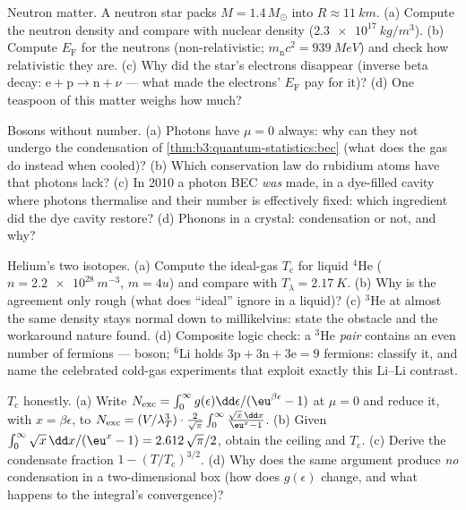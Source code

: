 \begin{exercise}[$\star\star$]\label{exo:b3:quantum-statistics:7}
Neutron matter. A neutron star packs $M = 1.4\,M_\odot$ into $R
\approx \qty{11}{km}$. (a) Compute the neutron density and compare
with nuclear density ($\qty{2.3e17}{kg/m^3}$). (b) Compute
$E_{\text{F}}$ for the neutrons (non-relativistic; $m_{\text{n}}c^2
= \qty{939}{MeV}$) and check how relativistic they are. (c) Why
did the star's electrons disappear (inverse beta decay:
$\text{e} + \text{p} \to \text{n} + \nu$ --- what made the
electrons' $E_{\text{F}}$ pay for it)? (d) One teaspoon of this
matter weighs how much?
\end{exercise}

\begin{exercise}[$\star\star$]\label{exo:b3:quantum-statistics:8}
Bosons without number. (a) Photons have $\mu = 0$ always: why can
they not undergo the condensation of
\cref{thm:b3:quantum-statistics:bec} (what does the gas do instead
when cooled)? (b) Which conservation law do rubidium atoms have
that photons lack? (c) In 2010 a photon BEC \emph{was} made, in a
dye-filled cavity where photons thermalise and their number is
effectively fixed: which ingredient did the dye cavity restore?
(d) Phonons in a crystal: condensation or not, and why?
\end{exercise}

\begin{exercise}[$\star\star$]\label{exo:b3:quantum-statistics:9}
Helium's two isotopes. (a) Compute the ideal-gas $T_{\text{c}}$
for liquid $^4$He ($n = \qty{2.2e28}{m^{-3}}$, $m = 4u$) and
compare with $T_\lambda = \qty{2.17}{K}$. (b) Why is the agreement
only rough (what does ``ideal'' ignore in a liquid)? (c) $^3$He at
almost the same density stays normal down to millikelvins: state
the obstacle and the workaround nature found. (d) Composite logic check: a $^3$He \emph{pair} contains an even
number of fermions --- boson; $^6$Li holds $3\text{p} + 3\text{n}
+ 3\text{e} = 9$ fermions: classify it, and name the celebrated
cold-gas experiments that exploit exactly this Li--Li contrast.
\end{exercise}

\begin{exercise}[$\star\star\star$]\label{exo:b3:quantum-statistics:10}
$T_{\text{c}}$ honestly. (a) Write $N_{\text{exc}} = \int_0^\infty
g(\epsilon)\dd\epsilon/(\eu^{\beta\epsilon} - 1)$ at $\mu = 0$ and
reduce it, with $x = \beta\epsilon$, to $N_{\text{exc}} =
(V/\lambda_T^3)\cdot\frac{2}{\sqrt\pi}\int_0^\infty\frac{\sqrt
x\,\dd x}{\eu^x - 1}$. (b) Given $\int_0^\infty\sqrt x\,\dd x/(
\eu^x - 1) = 2.612\,\sqrt\pi/2$, obtain the ceiling and
$T_{\text{c}}$. (c) Derive the condensate fraction $1 -
(T/T_{\text{c}})^{3/2}$. (d) Why does the same argument produce
\emph{no} condensation in a two-dimensional box (how does $g(
\epsilon)$ change, and what happens to the integral's
convergence)?
\end{exercise}

